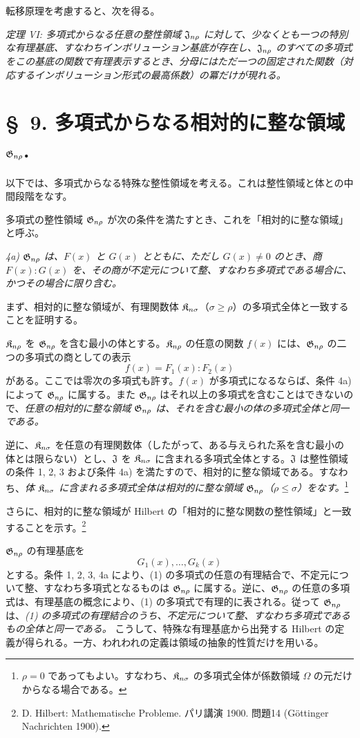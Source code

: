 \documentclass[11pt]{jlreq}
\begin{document}
転移原理を考慮すると、次を得る。

\emph{定理 VI: 多項式からなる任意の整性領域 $\mathfrak{J}_{n\rho}$ に対して、少なくとも一つの特別な有理基底、すなわちインボリューション基底が存在し、$\mathfrak{J}_{n\rho}$ のすべての多項式をこの基底の関数で有理表示するとき、分母にはただ一つの固定された関数（対応するインボリューション形式の最高係数）の冪だけが現れる。}

\section*{\S\ 9. 多項式からなる相対的に整な領域 $\mathfrak{G}_{n\rho}$.}

以下では、多項式からなる特殊な整性領域を考える。これは整性領域と体との中間段階をなす。

多項式の整性領域 $\mathfrak{G}_{n\rho}$ が次の条件を満たすとき、これを「相対的に整な領域」と呼ぶ。

\emph{4a) $\mathfrak{G}_{n\rho}$ は、$F(x)$ と $G(x)$ とともに、ただし $G(x)\ne0$ のとき、商 $F(x):G(x)$ を、その商が不定元について整、すなわち多項式である場合に、かつその場合に限り含む。}

まず、相対的に整な領域が、有理関数体 $\mathfrak{K}_{n\sigma}$（$\sigma\ge\rho$）の多項式全体と一致することを証明する。

$\mathfrak{K}_{n\rho}$ を $\mathfrak{G}_{n\rho}$ を含む最小の体とする。$\mathfrak{K}_{n\rho}$ の任意の関数 $f(x)$ には、$\mathfrak{G}_{n\rho}$ の二つの多項式の商としての表示
\[
  f(x)=F_1(x):F_2(x)
\]
がある。ここでは零次の多項式も許す。$f(x)$ が多項式になるならば、条件 4a) によって $\mathfrak{G}_{n\rho}$ に属する。また $\mathfrak{G}_{n\rho}$ はそれ以上の多項式を含むことはできないので、\emph{任意の相対的に整な領域 $\mathfrak{G}_{n\rho}$ は、それを含む最小の体の多項式全体と同一である。}

逆に、$\mathfrak{K}_{n\sigma}$ を任意の有理関数体（したがって、ある与えられた系を含む最小の体とは限らない）とし、$\mathfrak{J}$ を $\mathfrak{K}_{n\sigma}$ に含まれる多項式全体とする。$\mathfrak{J}$ は整性領域の条件 1, 2, 3 および条件 4a) を満たすので、相対的に整な領域である。すなわち、\emph{体 $\mathfrak{K}_{n\sigma}$ に含まれる多項式全体は相対的に整な領域 $\mathfrak{G}_{n\rho}$（$\rho\le\sigma$）をなす。}\footnote{$\rho=0$ であってもよい。すなわち、$\mathfrak{K}_{n\sigma}$ の多項式全体が係数領域 $\Omega$ の元だけからなる場合である。}

さらに、相対的に整な領域が Hilbert の「相対的に整な関数の整性領域」と一致することを示す。\footnote{D. Hilbert: Mathematische Probleme. パリ講演 1900. 問題14 (Göttinger Nachrichten 1900).}

$\mathfrak{G}_{n\rho}$ の有理基底を
\begin{equation}
  G_1(x),\ldots,G_k(x)
\tag{1}
\end{equation}
とする。条件 1, 2, 3, 4a により、(1) の多項式の任意の有理結合で、不定元について整、すなわち多項式となるものは $\mathfrak{G}_{n\rho}$ に属する。逆に、$\mathfrak{G}_{n\rho}$ の任意の多項式は、有理基底の概念により、(1) の多項式で有理的に表される。従って $\mathfrak{G}_{n\rho}$ は、\emph{(1) の多項式の有理結合のうち、不定元について整、すなわち多項式であるもの全体と同一である。} こうして、特殊な有理基底から出発する Hilbert の定義が得られる。一方、われわれの定義は領域の抽象的性質だけを用いる。
\end{document}
